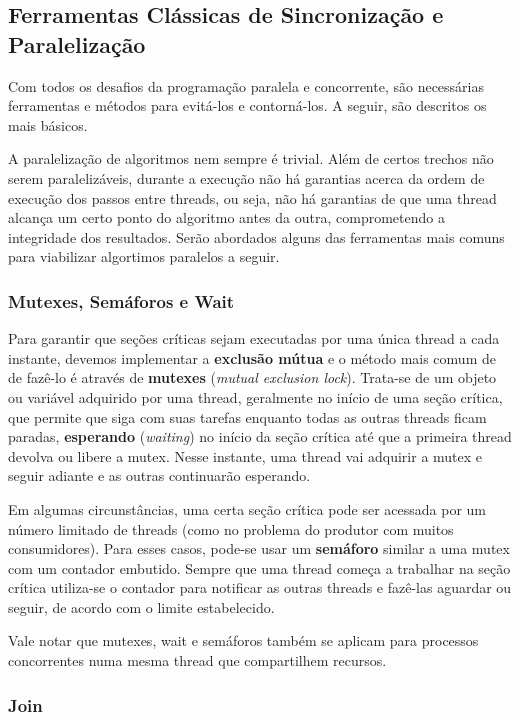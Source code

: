 \documentclass{article}
\begin{document}
\subsection{Ferramentas Clássicas de Sincronização e Paralelização}
\label{ssec:ferramentas classicas sincronizacao paralelizacao}
Com todos os desafios da programação paralela e concorrente, são necessárias ferramentas e métodos para evitá-los e contorná-los. A seguir, são descritos os mais básicos.

A paralelização de algoritmos nem sempre é trivial. Além de certos trechos não serem paralelizáveis, durante a execução não há garantias acerca da ordem de execução dos passos entre threads, ou seja, não há garantias de que uma thread alcança um certo ponto do algoritmo antes da outra, comprometendo a integridade dos resultados. Serão abordados alguns das ferramentas mais comuns para viabilizar algortimos paralelos a seguir.

\subsubsection{Mutexes, Semáforos e Wait}
\label{sssec:mutexes semaforos wait}

Para garantir que seções críticas sejam executadas por uma única thread a cada instante, devemos implementar a \textbf{exclusão mútua} e o método mais comum de de fazê-lo é através de \textbf{mutexes} ({\it mutual exclusion lock}). Trata-se de um objeto ou variável adquirido por uma thread, geralmente no início de uma seção crítica, que permite que siga com suas tarefas enquanto todas as outras threads ficam paradas, \textbf{esperando} ({\it waiting}) no início da seção crítica até que a primeira thread devolva ou libere a mutex. Nesse instante, uma thread vai adquirir a mutex e seguir adiante e as outras continuarão esperando.

Em algumas circunstâncias, uma certa seção crítica pode ser acessada por um número limitado de threads (como no problema do produtor com muitos consumidores). Para esses casos, pode-se usar um \textbf{semáforo} similar a uma mutex com um contador embutido. Sempre que uma thread começa a trabalhar na seção crítica utiliza-se o contador para notificar as outras threads e fazê-las aguardar ou seguir, de acordo com o limite estabelecido.

Vale notar que mutexes, wait e semáforos também se aplicam para processos concorrentes numa mesma thread que compartilhem recursos.

\subsubsection{Join}
\label{sssec:join}
\end{document}
